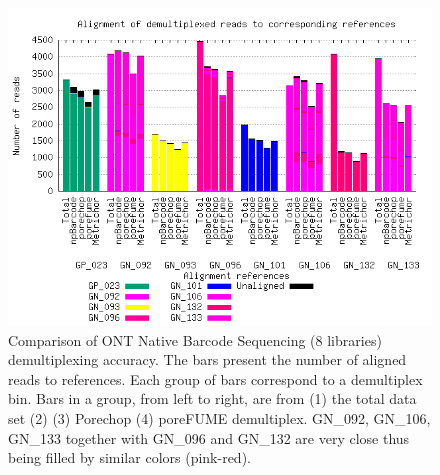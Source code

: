 

\begin{figure}[!hpt]
\includegraphics[width=\textwidth]{images/alignment.png}
\caption[Comparison of ONT Native Barcode Sequencing demultiplexing accuracy]
{Comparison of ONT Native Barcode Sequencing (8 libraries) demultiplexing accuracy. The bars present the number of aligned reads to references. Each group of bars correspond to a demultiplex bin. Bars in a group, from left to right, are from (1) the total data set (2) \npbarcode{} (3) Porechop (4) poreFUME demultiplex. GN\_092, GN\_106, GN\_133 together with GN\_096 and GN\_132 are very close thus being filled by similar colors (pink-red).}
\label{supp_fig:comparison}
\end{figure}

